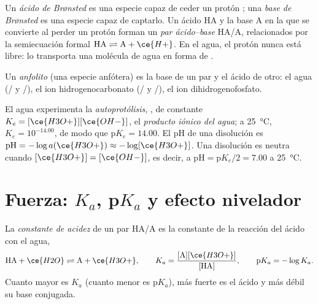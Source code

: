 \begin{definition}\label{def:b1:predominant-reaction:bronsted}
Un \emph{ácido de Brønsted} es una especie capaz de
ceder un protón ; una \emph{base de Brønsted} es
una especie capaz de captarlo. Un ácido HA y la base A en la que se
convierte al perder un protón forman un \emph{par ácido--base}
HA/A, relacionados por la semiecuación formal $\mathrm{HA} \rightleftharpoons
\mathrm{A} + \ce{H+}$. En el agua, el protón nunca está libre: lo
transporta una molécula de agua en forma de .
\end{definition}

\begin{definition}[Anfolito]\label{def:b1:predominant-reaction:ampholyte}
Un \emph{anfolito} (una especie anfótera) es la base de un
par y el ácido de otro: el agua (/ y /),
el ion hidrogenocarbonato (/
y /), el ion dihidrogenofosfato.
\end{definition}

\begin{definition}\label{def:b1:predominant-reaction:autoprotolysis}
El agua experimenta la \emph{autoprotólisis},
, de constante $K_e = [\ce{H3O+}][\ce{OH-}]$, el
\emph{producto iónico del agua}; a
\qty{25}{\celsius}, $K_e = 10^{-14.00}$, de modo que $\mathrm{p}K_e = 14.00$.
El pH de una disolución es $\mathrm{pH} = -\log a(\ce{H3O+}) \approx -\log[\ce{H3O+}]$.
Una disolución es neutra cuando $[\ce{H3O+}] = [\ce{OH-}]$, es decir, a
$\mathrm{pH} = \mathrm{p}K_e/2 = 7.00$ a \qty{25}{\celsius}.
\end{definition}

\section{Fuerza: \texorpdfstring{$K_a$}{Ka}, \texorpdfstring{p$K_a$}{pKa} y efecto nivelador}

\begin{definition}\label{def:b1:predominant-reaction:acidity-constant}
La \emph{constante de acidez} de un par HA/A es
la constante de la reacción del ácido con el agua,
\[
  \mathrm{HA} + \ce{H2O} \rightleftharpoons \mathrm{A} + \ce{H3O+}, \qquad
  K_a = \frac{[\mathrm{A}][\ce{H3O+}]}{[\mathrm{HA}]}, \qquad
  \mathrm{p}K_a = -\log K_a .
\]
Cuanto mayor es $K_a$ (cuanto menor es $\mathrm{p}K_a$), más fuerte es el
ácido y más débil su base conjugada.
\end{definition}

